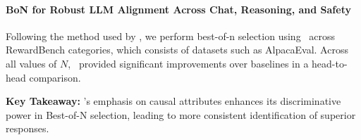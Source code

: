 \clearpage
\paragraph{BoN for Robust LLM Alignment Across Chat, Reasoning, and Safety} Following the method used by \citet{wu2025rewordbench}, we perform best-of-n selection using \carma\ across RewardBench categories, which consists of datasets such as AlpacaEval. Across all values of $N$, \carma\ provided significant improvements over baselines in a head-to-head comparison.

\vspace{0.05in}
\begin{takeawaybox}
\textbf{Key Takeaway:} \carma's emphasis on causal attributes enhances its discriminative power in Best-of-N selection, leading to more consistent identification of superior responses.
\end{takeawaybox}
\vspace{0.05in}

\begin{table}[ht]
    \centering
    \caption{\textbf{Win rates for \carma{} compared with RM and RRM on RewardBench}. We follow \citet{wu2025rewordbench} and take all 2985 prompts from RewardBench and get BoN responses from a  model using \carma{}, RM or RRM as the reward models. Following this, we separately compare responses generated by \carma{} with RM and RRM, using GPT-4 as a judge.\vspace{-0.1in}}
    \label{tab:bon_results_rewardbench}
\end{table}

